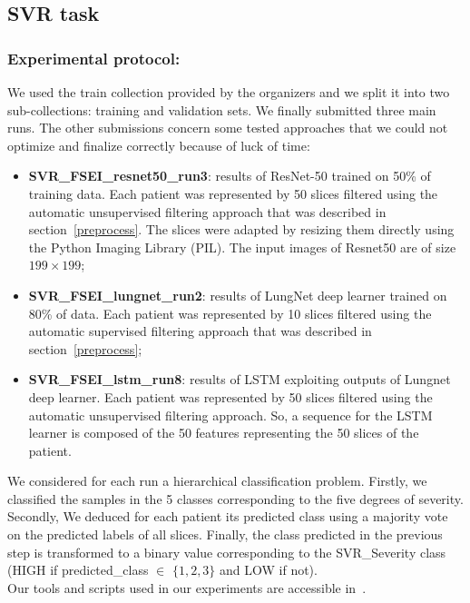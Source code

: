 \documentclass{llncs}
\begin{document}
\subsection{SVR task}
\subsubsection{Experimental protocol:}

We used the train collection provided by the organizers and we split it into two sub-collections: training and validation sets. We finally submitted three main runs. The other submissions concern some tested approaches that we could not optimize and finalize correctly because of luck of time:
\begin{itemize}
\item \textbf{SVR\_FSEI\_resnet50\_run3}: results of ResNet-50 trained on 50\% of training data. Each patient was represented by 50 slices filtered using the automatic unsupervised filtering approach that was described in section~\ref{preprocess}. The slices were adapted by resizing them directly using the Python Imaging Library (PIL). The input images of Resnet50 are of size $199\times199$;
\item \textbf{SVR\_FSEI\_lungnet\_run2}: results of LungNet deep learner trained on 80\% of data. Each patient was represented by 10 slices filtered using the automatic supervised filtering approach that was described in section~\ref{preprocess};
\item \textbf{SVR\_FSEI\_lstm\_run8}: results of LSTM exploiting outputs of Lungnet deep learner. Each patient was represented by 50 slices filtered using the automatic unsupervised filtering approach. So, a sequence for the LSTM learner is composed of the 50 features representing the 50 slices of the patient.
\end{itemize}

We considered for each run a hierarchical classification problem. Firstly, we classified the samples in the 5 classes corresponding to the five degrees of severity. Secondly, We deduced for each patient its predicted class using a majority vote on the predicted labels of all slices. Finally, the class predicted in the previous step is transformed to a binary value corresponding to the SVR\_Severity class (HIGH if predicted\_class $\in$ $\{1,2,3\}$ and LOW if not).\\

Our tools and scripts used in our experiments are accessible in~\cite{anouargit}.
\end{document}
